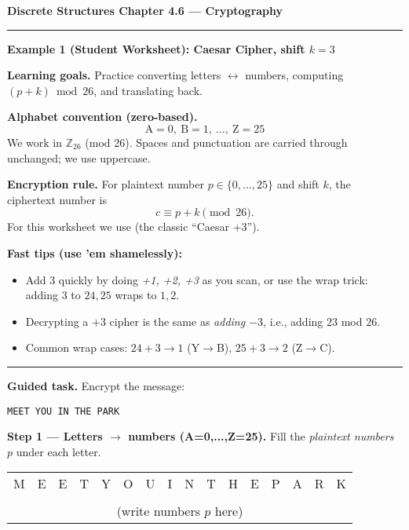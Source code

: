 \documentclass[12pt]{article}
\begin{document}
{\large \textbf{Discrete Structures \quad Chapter 4.6 — Cryptography}}

\hrule
\vspace{0.6em}

\textbf{Example 1 (Student Worksheet): Caesar Cipher, shift $k=3$}

\textbf{Learning goals.} Practice converting letters $\leftrightarrow$ numbers, computing $(p+k)\bmod 26$, and translating back.

\textbf{Alphabet convention (zero-based).}
\[
\text{A}=0,\ \text{B}=1,\ \ldots,\ \text{Z}=25
\]
We work in $\mathbb{Z}_{26}$ (mod 26). Spaces and punctuation are carried through unchanged; we use uppercase.

\textbf{Encryption rule.} For plaintext number $p\in\{0,\dots,25\}$ and shift $k$, the ciphertext number is
\[
c \equiv p + k \pmod{26}.
\]
For this worksheet we use  (the classic “Caesar +3”).

\textbf{Fast tips (use 'em shamelessly):}
\begin{itemize}[leftmargin=1.2em, itemsep=0.25em]
  \item Add $3$ quickly by doing \emph{+1, +2, +3} as you scan, or use the wrap trick: adding $3$ to $24,25$ wraps to $1,2$.
  \item Decrypting a $+3$ cipher is the same as \emph{adding $-3$}, i.e., adding $23$ mod $26$.
  \item Common wrap cases: $24{+}3\to 1$ (Y$\to$B), $25{+}3\to 2$ (Z$\to$C).
\end{itemize}

\hrule
\vspace{0.4em}

\textbf{Guided task.} Encrypt the message:

\medskip
\centerline{\Large \texttt{MEET YOU IN THE PARK}}
\medskip

\textbf{Step 1 — Letters $\rightarrow$ numbers (A=0,...,Z=25).} Fill the \emph{plaintext numbers $p$} under each letter.
\smallskip

\begin{tabular}{*{16}{c}}
M & E & E & T & Y & O & U & I & N & T & H & E & P & A & R & K \\
\multicolumn{16}{c}{\rule{0pt}{1.2em}}\\[-0.8em]
\multicolumn{16}{c}{\small (write numbers $p$ here)}
\end{tabular}

\medskip
\end{document}
